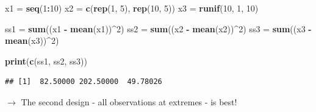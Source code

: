 \documentclass[10pt,ignorenonframetext,]{beamer}
\newenvironment{Shaded}{\begin{snugshade}}{\end{snugshade}}
\newcommand{\KeywordTok}[1]{\textcolor[rgb]{0.13,0.29,0.53}{\textbf{#1}}}
\newcommand{\DecValTok}[1]{\textcolor[rgb]{0.00,0.00,0.81}{#1}}
\newcommand{\StringTok}[1]{\textcolor[rgb]{0.31,0.60,0.02}{#1}}
\newcommand{\OperatorTok}[1]{\textcolor[rgb]{0.81,0.36,0.00}{\textbf{#1}}}
\newcommand{\NormalTok}[1]{#1}
\begin{document}
\begin{frame}[fragile]

\scriptsize

\begin{Shaded}
\begin{Highlighting}[]
\NormalTok{x1 =}\StringTok{ }\KeywordTok{seq}\NormalTok{(}\DecValTok{1}\OperatorTok{:}\DecValTok{10}\NormalTok{)}
\NormalTok{x2 =}\StringTok{ }\KeywordTok{c}\NormalTok{(}\KeywordTok{rep}\NormalTok{(}\DecValTok{1}\NormalTok{, }\DecValTok{5}\NormalTok{), }\KeywordTok{rep}\NormalTok{(}\DecValTok{10}\NormalTok{, }\DecValTok{5}\NormalTok{))}
\NormalTok{x3 =}\StringTok{ }\KeywordTok{runif}\NormalTok{(}\DecValTok{10}\NormalTok{, }\DecValTok{1}\NormalTok{, }\DecValTok{10}\NormalTok{)}

\NormalTok{ss1 =}\StringTok{ }\KeywordTok{sum}\NormalTok{((x1 }\OperatorTok{-}\StringTok{ }\KeywordTok{mean}\NormalTok{(x1))}\OperatorTok{^}\DecValTok{2}\NormalTok{)}
\NormalTok{ss2 =}\StringTok{ }\KeywordTok{sum}\NormalTok{((x2 }\OperatorTok{-}\StringTok{ }\KeywordTok{mean}\NormalTok{(x2))}\OperatorTok{^}\DecValTok{2}\NormalTok{)}
\NormalTok{ss3 =}\StringTok{ }\KeywordTok{sum}\NormalTok{((x3 }\OperatorTok{-}\StringTok{ }\KeywordTok{mean}\NormalTok{(x3))}\OperatorTok{^}\DecValTok{2}\NormalTok{)}

\KeywordTok{print}\NormalTok{(}\KeywordTok{c}\NormalTok{(ss1, ss2, ss3))}
\end{Highlighting}
\end{Shaded}

\begin{verbatim}
## [1]  82.50000 202.50000  49.78026
\end{verbatim}

\normalsize
\(\rightarrow\) The second design - all observations at extremes - is
best!

\end{frame}
\end{document}
